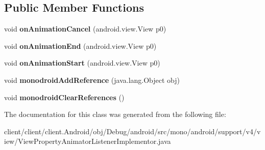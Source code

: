 \subsection*{Public Member Functions}
\begin{DoxyCompactItemize}
\item 
\hypertarget{classmono_1_1android_1_1support_1_1v4_1_1view_1_1ViewPropertyAnimatorListenerImplementor_a02bf20da31e0f81ebb3620fb9ff53859}{}void {\bfseries on\+Animation\+Cancel} (android.\+view.\+View p0)\label{classmono_1_1android_1_1support_1_1v4_1_1view_1_1ViewPropertyAnimatorListenerImplementor_a02bf20da31e0f81ebb3620fb9ff53859}

\item 
\hypertarget{classmono_1_1android_1_1support_1_1v4_1_1view_1_1ViewPropertyAnimatorListenerImplementor_a1d667373e9a8fc045c1d534c2dd0e794}{}void {\bfseries on\+Animation\+End} (android.\+view.\+View p0)\label{classmono_1_1android_1_1support_1_1v4_1_1view_1_1ViewPropertyAnimatorListenerImplementor_a1d667373e9a8fc045c1d534c2dd0e794}

\item 
\hypertarget{classmono_1_1android_1_1support_1_1v4_1_1view_1_1ViewPropertyAnimatorListenerImplementor_a2b36e1119b339c78bd7e45838d270d96}{}void {\bfseries on\+Animation\+Start} (android.\+view.\+View p0)\label{classmono_1_1android_1_1support_1_1v4_1_1view_1_1ViewPropertyAnimatorListenerImplementor_a2b36e1119b339c78bd7e45838d270d96}

\item 
\hypertarget{classmono_1_1android_1_1support_1_1v4_1_1view_1_1ViewPropertyAnimatorListenerImplementor_a5348ae6f507332f6bec7d1ffd2e03e39}{}void {\bfseries monodroid\+Add\+Reference} (java.\+lang.\+Object obj)\label{classmono_1_1android_1_1support_1_1v4_1_1view_1_1ViewPropertyAnimatorListenerImplementor_a5348ae6f507332f6bec7d1ffd2e03e39}

\item 
\hypertarget{classmono_1_1android_1_1support_1_1v4_1_1view_1_1ViewPropertyAnimatorListenerImplementor_a113554921abc116cf26103f4789a6efb}{}void {\bfseries monodroid\+Clear\+References} ()\label{classmono_1_1android_1_1support_1_1v4_1_1view_1_1ViewPropertyAnimatorListenerImplementor_a113554921abc116cf26103f4789a6efb}

\end{DoxyCompactItemize}


The documentation for this class was generated from the following file\+:\begin{DoxyCompactItemize}
\item 
client/client/client.\+Android/obj/\+Debug/android/src/mono/android/support/v4/view/View\+Property\+Animator\+Listener\+Implementor.\+java\end{DoxyCompactItemize}
